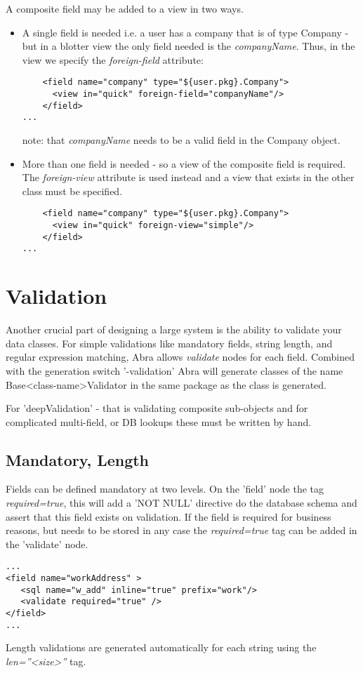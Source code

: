 \documentclass[10pt,openany]{book}
\begin{document}
A composite field may be added to a view in two ways.
\begin{itemize}
\item A single field is needed i.e. a user has a company
that is of type Company - but in a blotter view the only field needed is the
\textit{companyName}.  Thus, in the view we specify the
\textit{foreign-field} attribute:
\begin{verbatim}
    <field name="company" type="${user.pkg}.Company">
      <view in="quick" foreign-field="companyName"/>
    </field>
...
\end{verbatim}
note: that \textit{companyName} needs to be a valid field in the
Company object.
\item More than one field is needed - so a view of the composite field
is required.   The \textit{foreign-view} attribute is used instead and
a view that exists in the other class must be specified.  

\begin{verbatim}
    <field name="company" type="${user.pkg}.Company">
      <view in="quick" foreign-view="simple"/>
    </field>
...
\end{verbatim}

\end{itemize}

\section{Validation}
Another crucial part of designing a large system is the ability to
validate your data classes.  For simple validations like mandatory
fields, string length, and regular expression matching, Abra allows
 \textit{validate} nodes for each field.  Combined with the generation
switch '-validation' Abra will generate classes of the name
Base\textless class-name\textgreater Validator in the same package as
the class is 
generated.  


For 'deepValidation' - that is validating composite sub-objects and for
complicated multi-field, or DB lookups these must be written by hand.


\subsection{Mandatory, Length}
Fields can be defined mandatory at two levels.  On the 'field' node the
tag \textit{required=true}, this will add a 'NOT NULL' directive do
the database schema and assert that this field exists on validation.
If the field is required for business reasons, but needs to be stored
in any case the \textit{required=true} tag can be added in the
'validate' node.
\begin{verbatim}
...
<field name="workAddress" >
   <sql name="w_add" inline="true" prefix="work"/>
   <validate required="true" />
</field>
...
\end{verbatim}
Length validations are generated automatically for each string using
the \textit{len=''\textless size\textgreater ''} tag.
\end{document}
